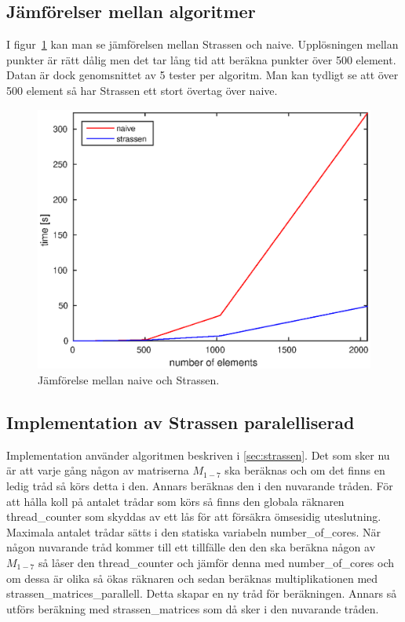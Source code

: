 \subsection{Jämförelser mellan algoritmer}
I figur~\ref{fig:comparison} kan man se jämförelsen mellan Strassen och naive. Upplösningen mellan punkter är rätt dålig men det tar lång tid att beräkna punkter över 500 element. Datan är dock genomsnittet av 5 tester per algoritm. Man kan tydligt se att över 500 element så har Strassen ett stort övertag över naive. 

\begin{figure}[H]
	\begin{center}
		\includegraphics[scale=0.6]{martin-tex/comparison.eps}
	\end{center}
	\caption{Jämförelse mellan naive och Strassen.}
	\label{fig:comparison}
\end{figure}

\subsection{Implementation av Strassen paralelliserad}
Implementation använder algoritmen beskriven i \ref{sec:strassen}. Det som sker nu är att varje gång någon av matriserna $M_{1-7}$ ska beräknas och om det finns en ledig tråd så körs detta i den. Annars beräknas den i den nuvarande tråden. För att hålla koll på antalet trådar som körs så finns den globala räknaren thread\_counter som skyddas av ett lås för att försäkra ömsesidig uteslutning. Maximala antalet trådar sätts i den statiska variabeln number\_of\_cores. När någon nuvarande tråd kommer till ett tillfälle den den ska beräkna någon av 
$M_{1-7}$ så låser den thread\_counter och jämför denna med number\_of\_cores och om dessa är olika så ökas räknaren och sedan beräknas multiplikationen med strassen\_matrices\_parallell. Detta skapar en ny tråd för beräkningen. Annars så utförs beräkning med strassen\_matrices som då sker i den nuvarande tråden.

